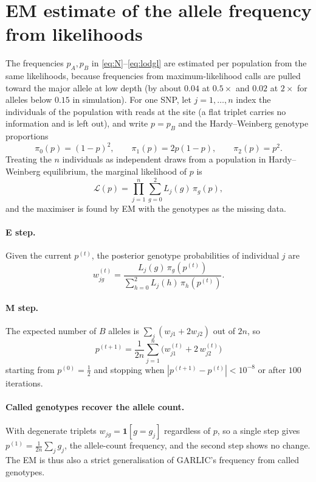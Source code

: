 \documentclass[11pt]{article}
\begin{document}
\section{EM estimate of the allele frequency from likelihoods}
\label{sec:em}

The frequencies $p_A, p_B$ in \eqref{eq:N}--\eqref{eq:lodgl} are estimated per population from the same likelihoods, because frequencies from maximum-likelihood calls are pulled toward the major allele at low depth (by about $0.04$ at $0.5\times$ and $0.02$ at $2\times$ for alleles below $0.15$ in simulation). For one SNP, let $j = 1,\dots,n$ index the individuals of the population with reads at the site (a flat triplet carries no information and is left out), and write $p = p_B$ and the Hardy--Weinberg genotype proportions
\begin{equation}
\pi_0(p) = (1-p)^2, \qquad \pi_1(p) = 2p(1-p), \qquad \pi_2(p) = p^2 .
\end{equation}
Treating the $n$ individuals as independent draws from a population in Hardy--Weinberg equilibrium, the marginal likelihood of $p$ is
\begin{equation}
\mathcal{L}(p) = \prod_{j=1}^{n} \sum_{g=0}^{2} L_j(g)\, \pi_g(p),
\label{eq:emlik}
\end{equation}
and the maximiser is found by EM with the genotypes as the missing data.

\paragraph{E step.} Given the current $p^{(t)}$, the posterior genotype probabilities of individual $j$ are
\begin{equation}
w_{jg}^{(t)} = \frac{L_j(g)\, \pi_g(p^{(t)})}{\sum_{h=0}^{2} L_j(h)\, \pi_h(p^{(t)})} .
\end{equation}

\paragraph{M step.} The expected number of $B$ alleles is $\sum_j (w_{j1} + 2 w_{j2})$ out of $2n$, so
\begin{equation}
\boxed{\;
p^{(t+1)} = \frac{1}{2n} \sum_{j=1}^{n} \big( w_{j1}^{(t)} + 2\, w_{j2}^{(t)} \big)
\;}
\label{eq:emstep}
\end{equation}
starting from $p^{(0)} = \tfrac12$ and stopping when $|p^{(t+1)} - p^{(t)}| < 10^{-8}$ or after $100$ iterations.

\paragraph{Called genotypes recover the allele count.} With degenerate triplets $w_{jg} = \mathbf{1}[g = g_j]$ regardless of $p$, so a single step gives $p^{(1)} = \frac{1}{2n}\sum_j g_j$, the allele-count frequency, and the second step shows no change. The EM is thus also a strict generalisation of GARLIC's frequency from called genotypes.
\end{document}
